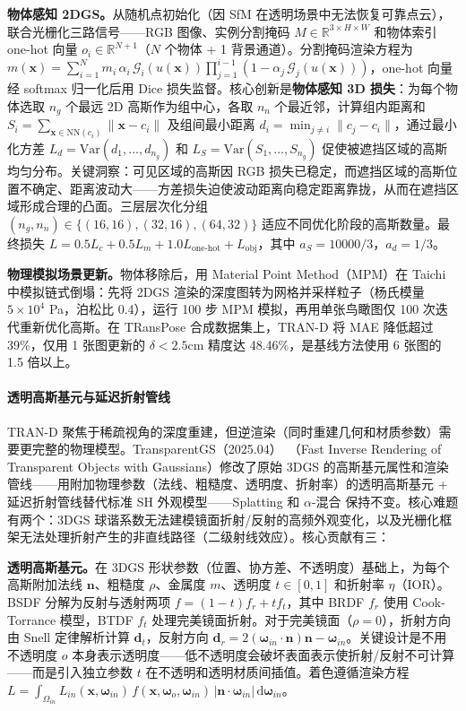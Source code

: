 \textbf{物体感知 2DGS。}从随机点初始化（因 SfM 在透明场景中无法恢复可靠点云），联合光栅化三路信号——RGB 图像、实例分割掩码 $M \in \mathbb{R}^{3 \times H \times W}$ 和物体索引 one-hot 向量 $o_i \in \mathbb{R}^{N+1}$（$N$ 个物体 + 1 背景通道）。分割掩码渲染方程为 $m(\mathbf{x}) = \sum_{i=1}^{N} m_i\,\alpha_i\,\mathcal{G}_i(u(\mathbf{x})) \prod_{j=1}^{i-1}(1-\alpha_j\,\mathcal{G}_j(u(\mathbf{x})))$，one-hot 向量经 softmax 归一化后用 Dice 损失监督。核心创新是\textbf{物体感知 3D 损失}：为每个物体选取 $n_g$ 个最远 2D 高斯作为组中心，各取 $n_n$ 个最近邻，计算组内距离和 $S_i = \sum_{\mathbf{x} \in \text{NN}(c_i)} \|\mathbf{x} - c_i\|$ 及组间最小距离 $d_i = \min_{j \neq i}\|c_j - c_i\|$，通过最小化方差 $L_d = \text{Var}(d_1, \ldots, d_{n_g})$ 和 $L_S = \text{Var}(S_1, \ldots, S_{n_g})$ 促使被遮挡区域的高斯均匀分布。关键洞察：可见区域的高斯因 RGB 损失已稳定，而遮挡区域的高斯位置不确定、距离波动大——方差损失迫使波动距离向稳定距离靠拢，从而在遮挡区域形成合理的凸面。三层层次化分组 $(n_g, n_n) \in \{(16,16), (32,16), (64,32)\}$ 适应不同优化阶段的高斯数量。最终损失 $L = 0.5 L_c + 0.5 L_m + 1.0 L_{\text{one-hot}} + L_{\text{obj}}$，其中 $a_S = 10000/3$，$a_d = 1/3$。

\textbf{物理模拟场景更新。}物体移除后，用 Material Point Method（MPM）在 Taichi 中模拟链式倒塌：先将 2DGS 渲染的深度图转为网格并采样粒子（杨氏模量 $5 \times 10^4$ Pa，泊松比 0.4），运行 100 步 MPM 模拟，再用单张鸟瞰图仅 100 次迭代重新优化高斯。在 TRansPose 合成数据集上，TRAN-D 将 MAE 降低超过 39\%，仅用 1 张图更新的 $\delta < 2.5\text{cm}$ 精度达 48.46\%，是基线方法使用 6 张图的 1.5 倍以上。

\paragraph{透明高斯基元与延迟折射管线}

TRAN-D 聚焦于稀疏视角的深度重建，但逆渲染（同时重建几何和材质参数）需要更完整的物理模型。TransparentGS（2025.04）~\cite{2504_18768}（Fast Inverse Rendering of Transparent Objects with Gaussians）修改了原始 3DGS 的高斯基元属性和渲染管线——用附加物理参数（法线、粗糙度、透明度、折射率）的透明高斯基元 + 延迟折射管线替代标准 SH 外观模型——Splatting 和 $\alpha$-混合 保持不变。核心难题有两个：3DGS 球谐系数无法建模镜面折射/反射的高频外观变化，以及光栅化框架无法处理折射产生的非直线路径（二级射线效应）。核心贡献有三：

\textbf{透明高斯基元。}在 3DGS 形状参数（位置、协方差、不透明度）基础上，为每个高斯附加法线 $\mathbf{n}$、粗糙度 $\rho$、金属度 $m$、透明度 $t \in [0,1]$ 和折射率 $\eta$（IOR）。BSDF 分解为反射与透射两项 $f = (1-t)f_r + t f_t$，其中 BRDF $f_r$ 使用 Cook-Torrance 模型，BTDF $f_t$ 处理完美镜面折射。对于完美镜面（$\rho=0$），折射方向由 Snell 定律解析计算 $\mathbf{d}_t$，反射方向 $\mathbf{d}_r = 2(\boldsymbol{\omega}_{in}\cdot\mathbf{n})\mathbf{n} - \boldsymbol{\omega}_{in}$。关键设计是不用不透明度 $o$ 本身表示透明度——低不透明度会破坏表面表示使折射/反射不可计算——而是引入独立参数 $t$ 在不透明和透明材质间插值。着色遵循渲染方程 $L = \int_{\Omega_{in}} L_{in}(\mathbf{x},\boldsymbol{\omega}_{in})\,f(\mathbf{x},\boldsymbol{\omega}_o,\boldsymbol{\omega}_{in})\,|\mathbf{n}\cdot\boldsymbol{\omega}_{in}|\,\mathrm{d}\boldsymbol{\omega}_{in}$。

